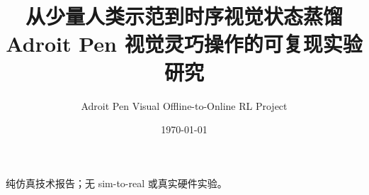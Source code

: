 \documentclass[UTF8,a4paper,11pt,fontset=fandol]{ctexart}
\title{\bfseries 从少量人类示范到时序视觉状态蒸馏\\
\large Adroit Pen 视觉灵巧操作的可复现实验研究}
\author{Adroit Pen Visual Offline-to-Online RL Project}
\date{\today}
\begin{document}
\maketitle
\begin{center}
\small 纯仿真技术报告；无 sim-to-real 或真实硬件实验。
\end{center}
\tableofcontents
\clearpage


















\appendix


\printbibliography[title={参考文献}]
\end{document}
